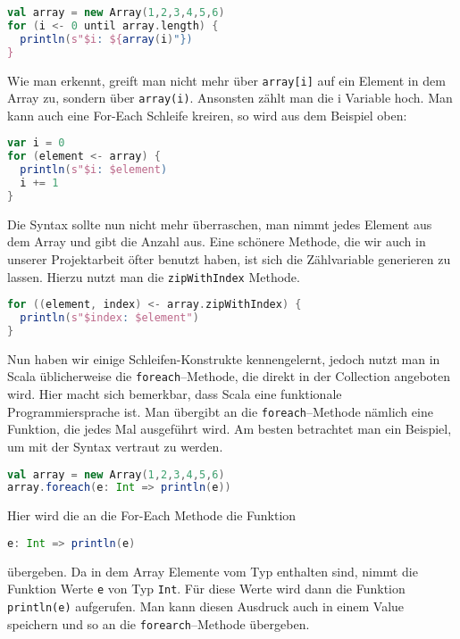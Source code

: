 \begin{lstlisting}[language=Scala]
val array = new Array(1,2,3,4,5,6)
for (i <- 0 until array.length) {
  println(s"$i: ${array(i)"})
}
\end{lstlisting}

Wie man erkennt, greift man nicht mehr über \texttt{array[i]} auf ein Element in dem Array zu, sondern über \texttt{array(i)}. Ansonsten zählt man die i Variable hoch. Man kann auch eine For-Each Schleife kreiren, so wird aus dem Beispiel oben:

\begin{lstlisting}[language=Scala,caption=For--Each in Scala]
var i = 0
for (element <- array) {
  println(s"$i: $element)
  i += 1
}
\end{lstlisting}

Die Syntax sollte nun nicht mehr überraschen, man nimmt jedes Element aus dem Array und gibt die Anzahl aus. Eine schönere Methode, die wir auch in unserer Projektarbeit öfter benutzt haben, ist sich die Zählvariable generieren zu lassen. Hierzu nutzt man die \texttt{zipWithIndex} Methode.

\begin{lstlisting}[language=Scala]
for ((element, index) <- array.zipWithIndex) {
  println(s"$index: $element")
}
\end{lstlisting}

Nun haben wir einige Schleifen-Konstrukte kennengelernt, jedoch nutzt man in Scala üblicherweise die \texttt{foreach}--Methode, die direkt in der Collection angeboten wird. Hier macht sich bemerkbar, dass Scala eine funktionale Programmiersprache ist. Man übergibt an die \texttt{foreach}--Methode nämlich eine Funktion, die jedes Mal ausgeführt wird. Am besten betrachtet man ein Beispiel, um mit der Syntax vertraut zu werden.

\begin{lstlisting}[language=Scala]
val array = new Array(1,2,3,4,5,6)
array.foreach(e: Int => println(e))
\end{lstlisting}

Hier wird die an die For-Each Methode die Funktion

\begin{lstlisting}[language=Scala,numbers=none]
e: Int => println(e)
\end{lstlisting}

übergeben. Da in dem Array Elemente vom Typ enthalten sind, nimmt die Funktion Werte \texttt{e} von Typ \texttt{Int}. Für diese Werte wird dann die Funktion \texttt{println(e)} aufgerufen. Man kann diesen Ausdruck auch in einem Value speichern und so an die \texttt{forearch}--Methode übergeben.

